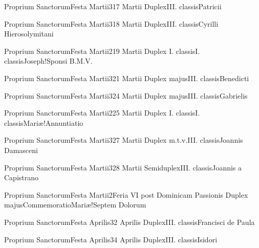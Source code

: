 \documentclass[psalterium-feriale.tex]{subfiles}
\begin{document}
	{Proprium Sanctorum}{Festa Martii}{3}{17 Martii}
	{Duplex}{III. classis}{Patricii}
	{}
	{}

	{Proprium Sanctorum}{Festa Martii}{3}{18 Martii}
	{Duplex}{III. classis}{Cyrilli Hierosolymitani}
	{}
	{}

	{Proprium Sanctorum}{Festa Martii}{2}{19 Martii}
	{Duplex I. classis}{I. classis}{Joseph!Sponsi B.M.V.}
	{}
	{}
\psalmodiapropria

	{Proprium Sanctorum}{Festa Martii}{3}{21 Martii}
	{Duplex majus}{III. classis}{Benedicti}
	{}
	{}

	{Proprium Sanctorum}{Festa Martii}{3}{24 Martii}
	{Duplex majus}{III. classis}{Gabrielis}
	{}
	{}
\psalmodiapropria

	{Proprium Sanctorum}{Festa Martii}{2}{25 Martii}
	{Duplex I. classis}{I. classis}{Mariæ!Annuntiatio}
	{}
	{}
\psalmodiapropria

	{Proprium Sanctorum}{Festa Martii}{3}{27 Martii}
	{Duplex m.t.v.}{III. classis}{Joannis Damasceni}
	{}
	{}

	{Proprium Sanctorum}{Festa Martii}{3}{28 Martii}
	{Semiduplex}{III. classis}{Joannis a Capistrano}
	{}
	{}

	{Proprium Sanctorum}{Festa Martii}{2}{Feria VI post Dominicam Passionis}
	{Duplex majus}{Commemoratio}{Mariæ!Septem Dolorum}
	{}
	{}
\psalmodiapropria

	{Proprium Sanctorum}{Festa Aprilis}{3}{2 Aprilis}
	{Duplex}{III. classis}{Francisci de Paula}
	{}
	{}

	{Proprium Sanctorum}{Festa Aprilis}{3}{4 Aprilis}
	{Duplex}{III. classis}{Isidori}
	{}
	{}
\end{document}
